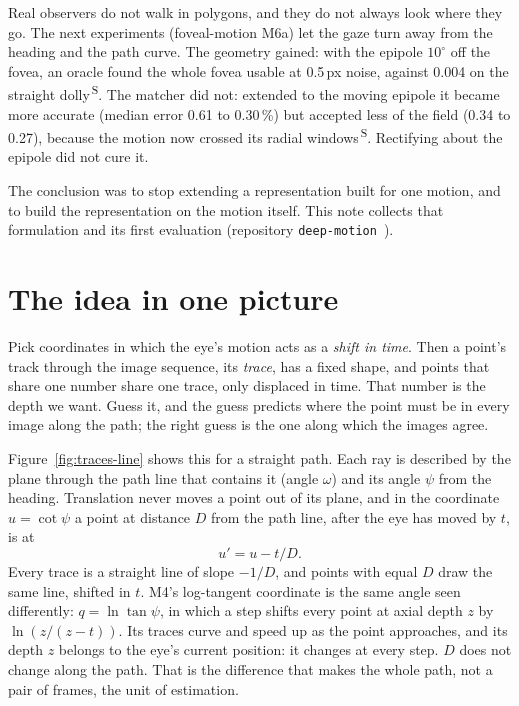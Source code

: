 \documentclass[11pt,a4paper]{article}
\newcommand{\code}[1]{\texttt{\small #1}}
\newcommand{\src}[1]{\textsuperscript{\,#1}}
\newcommand{\SB}{\src{S}}   %
\begin{document}
Real observers do not walk in polygons, and they do not always look where they go. The next experiments (foveal-motion
M6a) let the gaze turn away from the heading and the path curve. The geometry gained: with the epipole $10^\circ$ off the
fovea, an oracle found the whole fovea usable at 0.5\,px noise, against 0.004 on the straight dolly\SB. The matcher did
not: extended to the moving epipole it became more accurate (median error 0.61 to 0.30\,\%) but accepted less of the field
(0.34 to 0.27), because the motion now crossed its radial windows\SB. Rectifying about the epipole did not cure it.

The conclusion was to stop extending a representation built for one motion, and to build the representation on the
motion itself. This note collects that formulation and its first evaluation (repository \code{deep-motion}~\cite{dm}).

\section{The idea in one picture}\label{sec:idea}

Pick coordinates in which the eye's motion acts as a \emph{shift in time}. Then a point's track through the image
sequence, its \emph{trace}, has a fixed shape, and points that share one number share one trace, only displaced in
time. That number is the depth we want. Guess it, and the guess predicts where the point must be in every image along
the path; the right guess is the one along which the images agree.

Figure~\ref{fig:traces-line} shows this for a straight path. Each ray is described by the plane through the path line
that contains it (angle $\omega$) and its angle $\psi$ from the heading. Translation never moves a point out of its plane,
and in the coordinate $u=\cot\psi$ a point at distance $D$ from the path line, after the eye has moved by $t$, is at
\begin{equation}\label{eq:line}
  u' = u - t/D .
\end{equation}
Every trace is a straight line of slope $-1/D$, and points with equal $D$ draw the same line, shifted in $t$. M4's
log-tangent coordinate is the same angle seen differently: $q=\ln\tan\psi$, in which a step shifts every point at axial
depth $z$ by $\ln(z/(z-t))$. Its traces curve and speed up as the point approaches, and its depth $z$ belongs to the
eye's current position: it changes at every step. $D$ does not change along the path. That is the difference that makes
the whole path, not a pair of frames, the unit of estimation.
\end{document}
